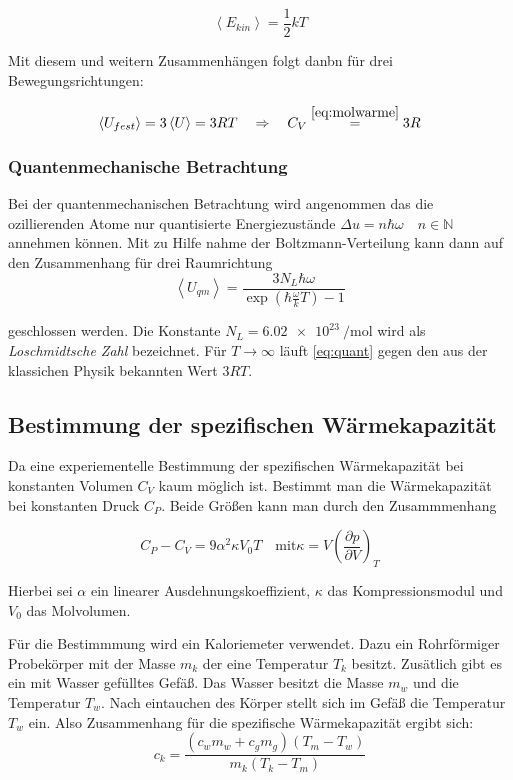 \begin{equation*}
\left< E_{kin} \right>=\frac{1}{2}kT
\end{equation*} 

Mit diesem und weitern Zusammenhängen folgt danbn für drei Bewegungsrichtungen:

\begin{equation*}
\left< U_{fest} \right> = 3 \left< U \right>=3RT \quad \Rightarrow \quad C_{V}\overset{\eqref{eq:molwarme}}{=}3R
\end{equation*}

\subsubsection{Quantenmechanische Betrachtung}
Bei der quantenmechanischen Betrachtung wird angenommen 
das die ozillierenden Atome nur quantisierte Energiezustände $\Delta u=n\hbar \omega \quad n\in\mathbb{N}$
annehmen können.
Mit zu Hilfe nahme der Boltzmann-Verteilung kann dann auf den Zusammenhang 
für drei Raumrichtung 
\begin{equation}
\label{eq:quant}
\left< U_{qm} \right> =\frac{3N_L \hbar \omega}{\exp\left(\hbar \frac{\omega}{k} T\right) -1}
\end{equation}

geschlossen werden.
Die Konstante $N_L = \SI{6.02e23}{\per\mol}$ wird als \emph{Loschmidtsche Zahl} bezeichnet.
Für $T\to\infty$ läuft \eqref{eq:quant} gegen den aus der klassichen Physik bekannten Wert 
$3RT$.

\subsection{Bestimmung der spezifischen Wärmekapazität}
Da eine experiementelle Bestimmung der spezifischen Wärmekapazität 
bei konstanten Volumen $C_V$ kaum möglich ist.
Bestimmt man die Wärmekapazität bei konstanten Druck $C_P$.
Beide Größen kann man durch den Zusammmenhang

\begin{equation}
\label{eq:umrechnung_cp_cv}
C_P-C_V=9\alpha^2\kappa V_0 T \quad \text{mit} \kappa=V\left(\frac{\partial p}{\partial V}\right)_T
\end{equation}

Hierbei sei $\alpha$ ein linearer Ausdehnungskoeffizient, $\kappa$ das Kompressionsmodul und
$V_0$ das Molvolumen.

Für die Bestimmmung wird ein Kaloriemeter verwendet.
Dazu ein Rohrförmiger Probekörper mit der Masse $m_k$ der eine Temperatur 
$T_k$ besitzt. Zusätlich gibt es ein mit Wasser gefülltes Gefäß.
Das Wasser besitzt die Masse $m_w$ und die Temperatur $T_w$.
Nach eintauchen des Körper stellt sich im Gefäß die 
Temperatur $T_w$ ein. Also Zusammenhang für die 
spezifische Wärmekapazität ergibt sich:
\begin{equation*}
\label{eq:zusammenhang_ck}
c_k=\frac{\left(c_wm_w+c_gm_g\right)\left(T_m-T_w\right)}{m_k\left(T_k-T_m\right)}
\end{equation*}

